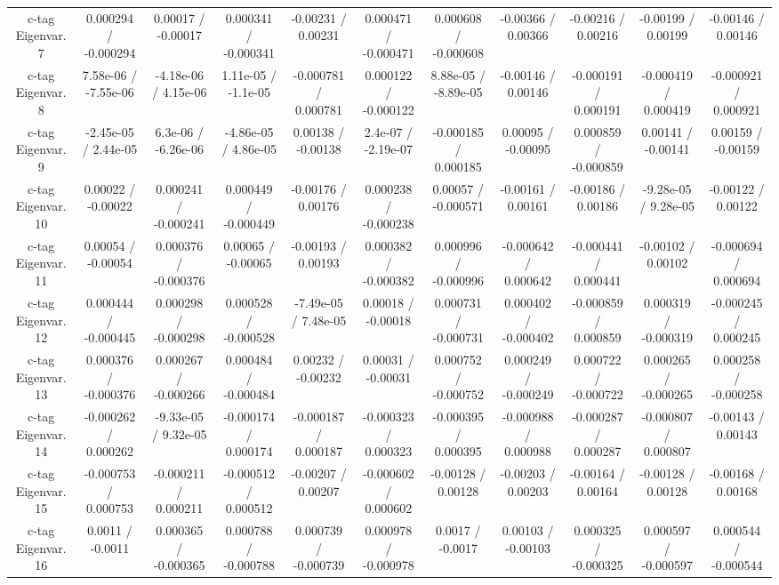 \begin{table}[htbp]
\begin{center}
\begin{tabular}{|c|c|c|c|c|c|c|c|c|c|c|}
  c-tag Eigenvar. 7 & 0.000294 / -0.000294 & 0.00017 / -0.00017 & 0.000341 / -0.000341 & -0.00231 / 0.00231 & 0.000471 / -0.000471 & 0.000608 / -0.000608 & -0.00366 / 0.00366 & -0.00216 / 0.00216 & -0.00199 / 0.00199 & -0.00146 / 0.00146 \\ 
  c-tag Eigenvar. 8 & 7.58e-06 / -7.55e-06 & -4.18e-06 / 4.15e-06 & 1.11e-05 / -1.1e-05 & -0.000781 / 0.000781 & 0.000122 / -0.000122 & 8.88e-05 / -8.89e-05 & -0.00146 / 0.00146 & -0.000191 / 0.000191 & -0.000419 / 0.000419 & -0.000921 / 0.000921 \\ 
  c-tag Eigenvar. 9 & -2.45e-05 / 2.44e-05 & 6.3e-06 / -6.26e-06 & -4.86e-05 / 4.86e-05 & 0.00138 / -0.00138 & 2.4e-07 / -2.19e-07 & -0.000185 / 0.000185 & 0.00095 / -0.00095 & 0.000859 / -0.000859 & 0.00141 / -0.00141 & 0.00159 / -0.00159 \\ 
  c-tag Eigenvar. 10 & 0.00022 / -0.00022 & 0.000241 / -0.000241 & 0.000449 / -0.000449 & -0.00176 / 0.00176 & 0.000238 / -0.000238 & 0.00057 / -0.000571 & -0.00161 / 0.00161 & -0.00186 / 0.00186 & -9.28e-05 / 9.28e-05 & -0.00122 / 0.00122 \\ 
  c-tag Eigenvar. 11 & 0.00054 / -0.00054 & 0.000376 / -0.000376 & 0.00065 / -0.00065 & -0.00193 / 0.00193 & 0.000382 / -0.000382 & 0.000996 / -0.000996 & -0.000642 / 0.000642 & -0.000441 / 0.000441 & -0.00102 / 0.00102 & -0.000694 / 0.000694 \\ 
  c-tag Eigenvar. 12 & 0.000444 / -0.000445 & 0.000298 / -0.000298 & 0.000528 / -0.000528 & -7.49e-05 / 7.48e-05 & 0.00018 / -0.00018 & 0.000731 / -0.000731 & 0.000402 / -0.000402 & -0.000859 / 0.000859 & 0.000319 / -0.000319 & -0.000245 / 0.000245 \\ 
  c-tag Eigenvar. 13 & 0.000376 / -0.000376 & 0.000267 / -0.000266 & 0.000484 / -0.000484 & 0.00232 / -0.00232 & 0.00031 / -0.00031 & 0.000752 / -0.000752 & 0.000249 / -0.000249 & 0.000722 / -0.000722 & 0.000265 / -0.000265 & 0.000258 / -0.000258 \\ 
  c-tag Eigenvar. 14 & -0.000262 / 0.000262 & -9.33e-05 / 9.32e-05 & -0.000174 / 0.000174 & -0.000187 / 0.000187 & -0.000323 / 0.000323 & -0.000395 / 0.000395 & -0.000988 / 0.000988 & -0.000287 / 0.000287 & -0.000807 / 0.000807 & -0.00143 / 0.00143 \\ 
  c-tag Eigenvar. 15 & -0.000753 / 0.000753 & -0.000211 / 0.000211 & -0.000512 / 0.000512 & -0.00207 / 0.00207 & -0.000602 / 0.000602 & -0.00128 / 0.00128 & -0.00203 / 0.00203 & -0.00164 / 0.00164 & -0.00128 / 0.00128 & -0.00168 / 0.00168 \\ 
  c-tag Eigenvar. 16 & 0.0011 / -0.0011 & 0.000365 / -0.000365 & 0.000788 / -0.000788 & 0.000739 / -0.000739 & 0.000978 / -0.000978 & 0.0017 / -0.0017 & 0.00103 / -0.00103 & 0.000325 / -0.000325 & 0.000597 / -0.000597 & 0.000544 / -0.000544 \\ 

\end{tabular}
\end{center}
\end{table}
